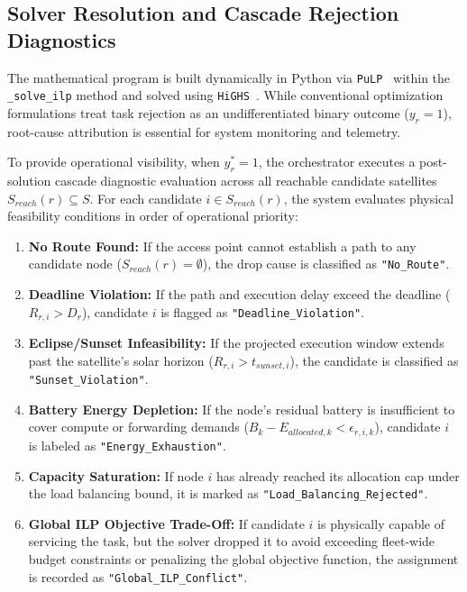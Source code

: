 \subsection{Solver Resolution and Cascade Rejection Diagnostics}
\label{subsec:cascade_diagnostics}

The mathematical program is built dynamically in Python via \texttt{PuLP}~\cite{pulp2011} within the \texttt{\_solve\_ilp} method and solved using \texttt{HiGHS}~\cite{huangfu2018highs, bagini_repo_2026}. 
While conventional optimization formulations treat task rejection as an undifferentiated binary outcome ($y_r = 1$), root-cause attribution is essential for system monitoring and telemetry.

To provide operational visibility, when $y_r^* = 1$, the orchestrator executes a post-solution cascade diagnostic evaluation across all reachable candidate satellites $S_{reach}(r) \subseteq S$. 
For each candidate $i \in S_{reach}(r)$, the system evaluates physical feasibility conditions in order of operational priority:
\begin{enumerate}
    \item \textbf{No Route Found:} If the access point cannot establish a path to any candidate node ($S_{reach}(r) = \emptyset$), the drop cause is classified as \texttt{"No\_Route"}.
    \item \textbf{Deadline Violation:} If the path and execution delay exceed the deadline ($R_{r,i} > D_r$), candidate $i$ is flagged as \texttt{"Deadline\_Violation"}.
    \item \textbf{Eclipse/Sunset Infeasibility:} If the projected execution window extends past the satellite's solar horizon ($R_{r,i} > t_{sunset,i}$), the candidate is classified as \texttt{"Sunset\_Violation"}.
    \item \textbf{Battery Energy Depletion:} If the node's residual battery is insufficient to cover compute or forwarding demands ($B_k - E_{allocated,k} < \epsilon_{r,i,k}$), candidate $i$ is labeled as \texttt{"Energy\_Exhaustion"}.
    \item \textbf{Capacity Saturation:} If node $i$ has already reached its allocation cap under the load balancing bound, it is marked as \texttt{"Load\_Balancing\_Rejected"}.
    \item \textbf{Global ILP Objective Trade-Off:} If candidate $i$ is physically capable of servicing the task, but the solver dropped it to avoid exceeding fleet-wide budget constraints or penalizing the global objective function, the assignment is recorded as \texttt{"Global\_ILP\_Conflict"}.
\end{enumerate}

